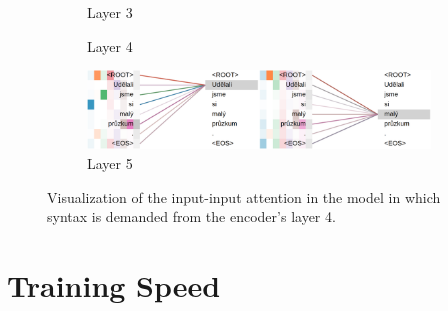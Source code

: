 \begin{figure}[t]
\begin{subfigure}[b]{0.9\textwidth}
        \caption{Layer 3}
    \end{subfigure}
    \begin{subfigure}[b]{0.9\textwidth}
        \centering
        \caption{Layer 4}
    \end{subfigure}
    \begin{subfigure}[b]{0.9\textwidth}
        \centering
	    \includegraphics[width=\textwidth]{img/att-from4-l5.png}
        \caption{Layer 5}
    \end{subfigure}
    \caption{Visualization of the input-input attention in the \DepParse model in which syntax is demanded from the encoder's layer 4.}
    \label{fig:att-from4}
\end{figure}


\section{Training Speed}
\label{result-speed}

